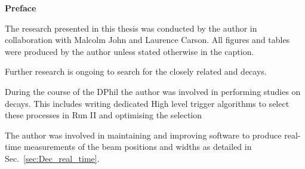 
%




\begin{alwayssingle} 
 \thispagestyle{empty}
 \begin{center}
   \vspace*{1.5cm}
   {\Large \bfseries  Preface}
 \end{center}
 \vspace{0.5cm}
 The research presented in this thesis was conducted by the author in collaboration with Malcolm John and Laurence Carson. All figures and tables were produced by the author unless stated otherwise in the caption.  

 Further research is ongoing to search for the closely related \decay{\Bcp}{\Dsp\phiz} and \decay{\Bc}{\Dp\Kstarz} decays. 

 During the course of the DPhil the author was involved in performing studies on \decay{\Dp}{\pip\piz} decays. This includes writing dedicated High level trigger algorithms to select these processes in Run II and optimising the selection  


 The author was involved in maintaining and improving software to produce real-time measurements of the \lhc beam positions and widths as detailed in Sec.~\ref{sec:Dec_real_time}. 
\end{alwayssingle}



